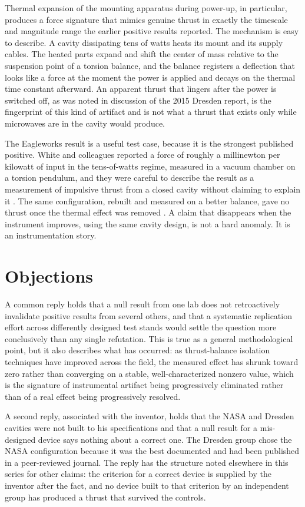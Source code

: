 \documentclass[11pt]{article}
\begin{document}
Thermal expansion of the mounting apparatus during power-up, in particular, produces a force signature that mimics genuine thrust in exactly the timescale and magnitude range the earlier positive results reported. The mechanism is easy to describe. A cavity dissipating tens of watts heats its mount and its supply cables. The heated parts expand and shift the center of mass relative to the suspension point of a torsion balance, and the balance registers a deflection that looks like a force at the moment the power is applied and decays on the thermal time constant afterward. An apparent thrust that lingers after the power is switched off, as was noted in discussion of the 2015 Dresden report, is the fingerprint of this kind of artifact and is not what a thrust that exists only while microwaves are in the cavity would produce.

The Eagleworks result is a useful test case, because it is the strongest published positive. White and colleagues reported a force of roughly a millinewton per kilowatt of input in the tens-of-watts regime, measured in a vacuum chamber on a torsion pendulum, and they were careful to describe the result as a measurement of impulsive thrust from a closed cavity without claiming to explain it \cite{W2017}. The same configuration, rebuilt and measured on a better balance, gave no thrust once the thermal effect was removed \cite{TNW2022}. A claim that disappears when the instrument improves, using the same cavity design, is not a hard anomaly. It is an instrumentation story.

\section{Objections}

A common reply holds that a null result from one lab does not retroactively invalidate positive results from several others, and that a systematic replication effort across differently designed test stands would settle the question more conclusively than any single refutation. This is true as a general methodological point, but it also describes what has occurred: as thrust-balance isolation techniques have improved across the field, the measured effect has shrunk toward zero rather than converging on a stable, well-characterized nonzero value, which is the signature of instrumental artifact being progressively eliminated rather than of a real effect being progressively resolved.

A second reply, associated with the inventor, holds that the NASA and Dresden cavities were not built to his specifications and that a null result for a mis-designed device says nothing about a correct one. The Dresden group chose the NASA configuration because it was the best documented and had been published in a peer-reviewed journal. The reply has the structure noted elsewhere in this series for other claims: the criterion for a correct device is supplied by the inventor after the fact, and no device built to that criterion by an independent group has produced a thrust that survived the controls.
\end{document}
